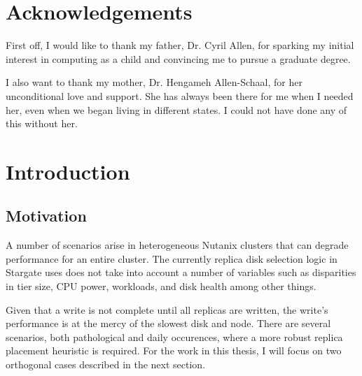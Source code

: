 \documentclass[12pt]{article}
\begin{document}
\section*{Acknowledgements}
\thispagestyle{empty}

First off, I would like to thank my father, Dr. Cyril Allen, for sparking my
initial interest in computing as a child and convincing me to pursue a graduate
degree.

I also want to thank my mother, Dr. Hengameh Allen-Schaal, for her
unconditional love and support. She has always been there for me when I needed
her, even when we began living in different states. I could not have done any
of this without her.





\clearpage
\newpage


\tableofcontents
\newpage

\listoffigures
\newpage

\listoftables
\newpage


\newpage
\FloatBarrier
\section{Introduction}

  \subsection{Motivation}

  A number of scenarios arise in heterogeneous Nutanix clusters that can
  degrade performance for an entire cluster. The currently replica disk
  selection logic in Stargate uses does not take into account a number of
  variables such as disparities in tier size, CPU power, workloads, and disk
  health among other things.

  Given that a write is not complete until all replicas are written, the
  write's performance is at the mercy of the slowest disk and node. There are
  several scenarios, both pathological and daily occurences, where a more
  robust replica placement heuristic is required. For the work in this thesis,
  I will focus on two orthogonal cases described in the next section.
\end{document}
